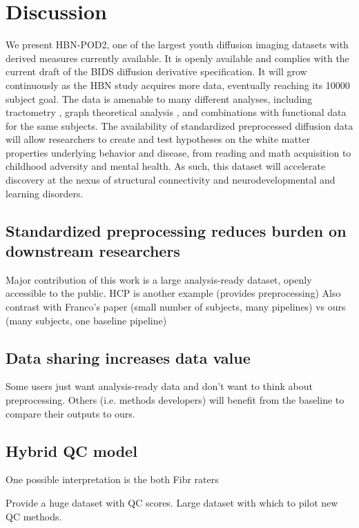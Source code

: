 \documentclass[fleqn,10pt]{wlscirep}
\begin{document}
\section*{Discussion}

We present HBN-POD2, one of the largest youth diffusion imaging datasets with
derived measures currently available. It is openly available and complies with
the current draft of the BIDS diffusion derivative specification. It will grow
continuously as the HBN study acquires more data, eventually reaching its
\num{10000} subject goal. The data is amenable to many different analyses,
including tractometry \cite{yeatman2012-rc}, graph theoretical analysis
\cite{yeh2020-nu}, and combinations with functional data for the same subjects.
The availability of standardized preprocessed diffusion data will allow
researchers to create and test hypotheses on the white matter properties
underlying behavior and disease, from reading and math acquisition to childhood
adversity and mental health. As such, this dataset will accelerate discovery at
the nexus of structural connectivity and neurodevelopmental and learning
disorders.

\subsection*{Standardized preprocessing reduces burden on downstream researchers}

Major contribution of this work is a large analysis-ready dataset, openly accessible to the public.
HCP is another example (provides preprocessing)
Also contrast with Franco's paper (small number of subjects, many pipelines) vs ours (many subjects, one baseline pipeline)

\subsection*{Data sharing increases data value}

Some users just want analysis-ready data and don't want to think about preprocessing. Others (i.e. methods developers) will benefit from the baseline to compare their outputs to ours.

\subsection*{Hybrid QC model}

One possible interpretation is the both Fibr raters

Provide a huge dataset with QC scores. Large dataset with which to pilot new QC methods.
\end{document}
